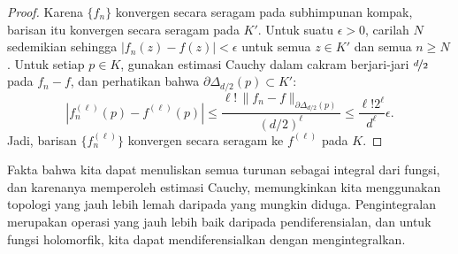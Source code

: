 \documentclass[12pt,openany]{book}
\newcommand{\sabs}[1]{\lvert {#1} \rvert}
\newcommand{\snorm}[1]{\lVert {#1} \rVert}
\newcommand{\abs}[1]{\left\lvert {#1} \right\rvert}
\theoremstyle{plain}
\theoremstyle{remark}
\theoremstyle{definition}
\theoremstyle{exercise}
\theoremstyle{example}
\begin{document}
\begin{proof}
Karena $\{ f_n \}$ konvergen secara seragam pada subhimpunan kompak, barisan itu konvergen secara seragam
pada $K'$.  Untuk suatu $\epsilon > 0$, carilah $N$ sedemikian sehingga 
$\sabs{f_n(z)-f(z)} < \epsilon$ untuk semua $z \in K'$ dan
semua $n \geq N$.
Untuk setiap $p \in K$, gunakan estimasi Cauchy dalam cakram berjari-jari $\nicefrac{d}{2}$
pada $f_n-f$, dan perhatikan bahwa
$\partial \Delta_{d/2}(p) \subset K'$:
\begin{equation*}
\abs{
f_n^{(\ell)}(p)
-
f^{(\ell)}(p)
}
\leq
\frac{\ell! \, \snorm{f_n-f}_{\partial \Delta_{d/2}(p)}}{{(d/2)}^{\ell}}
\leq
\frac{\ell!2^\ell}{d^\ell}\epsilon .
\end{equation*}
Jadi, barisan $\bigl\{ f_n^{(\ell)} \bigr\}$ konvergen secara seragam ke $f^{(\ell)}$ pada $K$.
\end{proof}

Fakta bahwa kita dapat menuliskan semua turunan sebagai
integral dari fungsi, dan karenanya memperoleh estimasi Cauchy,
memungkinkan kita menggunakan topologi yang jauh lebih lemah daripada yang mungkin diduga.
Pengintegralan merupakan operasi yang jauh lebih baik daripada pendiferensialan, dan untuk
fungsi holomorfik, kita dapat mendiferensialkan dengan mengintegralkan.
\end{document}
